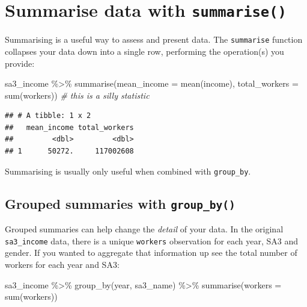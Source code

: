 \documentclass[
]{book}
\newenvironment{Shaded}{\begin{snugshade}}{\end{snugshade}}
\newcommand{\AttributeTok}[1]{\textcolor[rgb]{0.77,0.63,0.00}{#1}}
\newcommand{\CommentTok}[1]{\textcolor[rgb]{0.56,0.35,0.01}{\textit{#1}}}
\newcommand{\FunctionTok}[1]{\textcolor[rgb]{0.00,0.00,0.00}{#1}}
\newcommand{\NormalTok}[1]{#1}
\newcommand{\SpecialCharTok}[1]{\textcolor[rgb]{0.00,0.00,0.00}{#1}}
\begin{document}
\hypertarget{summarise-data-with-summarise}{%
\section{\texorpdfstring{Summarise data with \texttt{summarise()}}{Summarise data with summarise()}}\label{summarise-data-with-summarise}}

Summarising is a useful way to assess and present data. The \texttt{summarise} function collapses your data down into a single row, performing the operation(s) you provide:

\begin{Shaded}
\begin{Highlighting}[]
\NormalTok{sa3\_income }\SpecialCharTok{\%\textgreater{}\%} 
  \FunctionTok{summarise}\NormalTok{(}\AttributeTok{mean\_income =} \FunctionTok{mean}\NormalTok{(income),}
            \AttributeTok{total\_workers =} \FunctionTok{sum}\NormalTok{(workers))  }\CommentTok{\# this is a silly statistic}
\end{Highlighting}
\end{Shaded}

\begin{verbatim}
## # A tibble: 1 x 2
##   mean_income total_workers
##         <dbl>         <dbl>
## 1      50272.     117002608
\end{verbatim}

Summarising is usually only useful when combined with \texttt{group\_by}.

\hypertarget{grouped-summaries-with-group_by}{%
\subsection{\texorpdfstring{Grouped summaries with \texttt{group\_by()}}{Grouped summaries with group\_by()}}\label{grouped-summaries-with-group_by}}

Grouped summaries can help change the \emph{detail} of your data. In the original \texttt{sa3\_income} data, there is a unique \texttt{workers} observation for each year, SA3 and gender. If you wanted to aggregate that information up see the total number of workers for each year and SA3:

\begin{Shaded}
\begin{Highlighting}[]
\NormalTok{sa3\_income }\SpecialCharTok{\%\textgreater{}\%} 
  \FunctionTok{group\_by}\NormalTok{(year, sa3\_name) }\SpecialCharTok{\%\textgreater{}\%} 
  \FunctionTok{summarise}\NormalTok{(}\AttributeTok{workers =} \FunctionTok{sum}\NormalTok{(workers))}
\end{Highlighting}
\end{Shaded}
\end{document}
